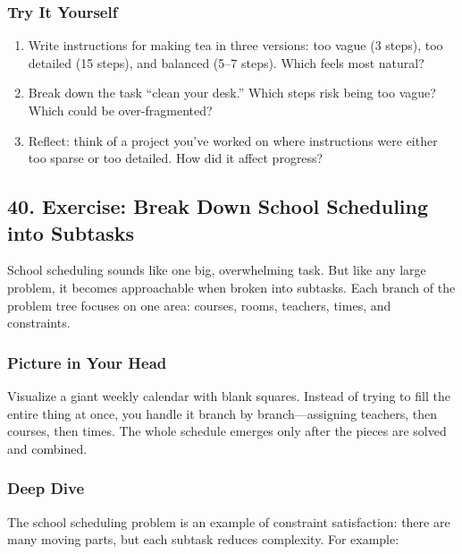 \documentclass[
  letterpaper,
  DIV=11,
  numbers=noendperiod]{scrreprt}
\providecommand{\tightlist}{%
  \setlength{\itemsep}{0pt}\setlength{\parskip}{0pt}}
\begin{document}
\subsubsection{Try It Yourself}\label{try-it-yourself-38}

\begin{enumerate}
\def\labelenumi{\arabic{enumi}.}
\tightlist
\item
  Write instructions for making tea in three versions: too vague (3
  steps), too detailed (15 steps), and balanced (5--7 steps). Which
  feels most natural?
\item
  Break down the task ``clean your desk.'' Which steps risk being too
  vague? Which could be over-fragmented?
\item
  Reflect: think of a project you've worked on where instructions were
  either too sparse or too detailed. How did it affect progress?
\end{enumerate}

\subsection{40. Exercise: Break Down School Scheduling into
Subtasks}\label{exercise-break-down-school-scheduling-into-subtasks}

School scheduling sounds like one big, overwhelming task. But like any
large problem, it becomes approachable when broken into subtasks. Each
branch of the problem tree focuses on one area: courses, rooms,
teachers, times, and constraints.

\subsubsection{Picture in Your Head}\label{picture-in-your-head-39}

Visualize a giant weekly calendar with blank squares. Instead of trying
to fill the entire thing at once, you handle it branch by
branch---assigning teachers, then courses, then times. The whole
schedule emerges only after the pieces are solved and combined.

\subsubsection{Deep Dive}\label{deep-dive-9}

The school scheduling problem is an example of constraint satisfaction:
there are many moving parts, but each subtask reduces complexity. For
example:
\end{document}

